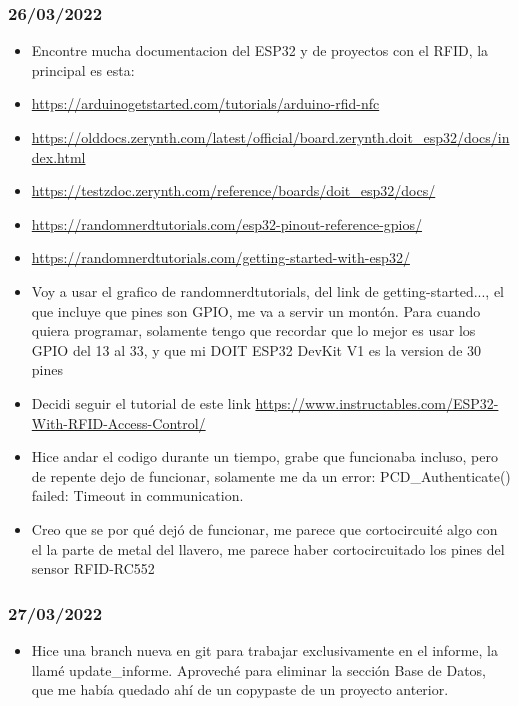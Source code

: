 \documentclass[../informe_krapp.tex]{subfiles}
\begin{document}
\subsubsection{26/03/2022}
\begin{itemize}
	\item Encontre mucha documentacion del ESP32 y de proyectos con el RFID, la principal es esta:
	\item \url{https://arduinogetstarted.com/tutorials/arduino-rfid-nfc}
	\item \url{https://olddocs.zerynth.com/latest/official/board.zerynth.doit_esp32/docs/index.html}
	\item \url{https://testzdoc.zerynth.com/reference/boards/doit_esp32/docs/}
	\item \url{https://randomnerdtutorials.com/esp32-pinout-reference-gpios/}
	\item \url{https://randomnerdtutorials.com/getting-started-with-esp32/}
	\item Voy a usar el grafico de randomnerdtutorials, del link de getting-started...,
	      el que incluye que pines son GPIO, me va a servir un montón.
	      Para cuando quiera programar, solamente tengo que recordar que lo mejor es usar los
	      GPIO del 13 al 33, y que mi DOIT ESP32 DevKit V1 es la version de 30 pines
	\item Decidi seguir el tutorial de este link
	      \url{https://www.instructables.com/ESP32-With-RFID-Access-Control/}
	\item Hice andar el codigo durante un tiempo, grabe que funcionaba incluso, pero de
	      repente dejo de funcionar, solamente me da un error:
	      PCD\_Authenticate() failed: Timeout in communication.
	\item Creo que se por qué dejó de funcionar, me parece que cortocircuité algo
	      con el la parte de metal del llavero, me parece haber cortocircuitado
	      los pines del sensor RFID-RC552

\end{itemize}
\subsubsection{27/03/2022}
\begin{itemize}
	\item Hice una branch nueva en git para trabajar exclusivamente en el informe,
	      la llamé update\_informe.
	      Aproveché para eliminar la sección Base de Datos, que me había quedado ahí
	      de un copypaste de un proyecto anterior.
\end{itemize}
\end{document}
